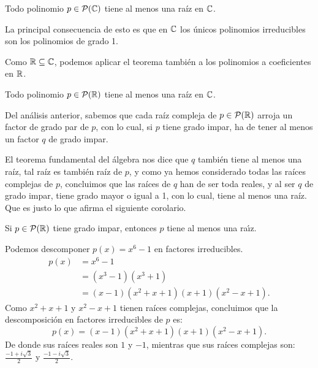 \medskip

\begin{thm}
Todo polinomio $p\in\mathcal{P}(\mathbb{C})$ tiene al menos una raíz en $\mathbb{C}$.
\end{thm}

La principal consecuencia de esto es que en $\mathbb{C}$ los únicos polinomios irreducibles son los polinomios de grado 1.

Como $\mathbb{R}\subseteq \mathbb{C}$, podemos aplicar el teorema también a los polinomios a coeficientes en $\mathbb{R}$.


\medskip

\begin{thm}
Todo polinomio $p\in\mathcal{P}(\mathbb{R})$ tiene al menos una raíz en $\mathbb{C}$.
\end{thm}

Del análisis anterior, sabemos que cada raíz compleja de $p\in\mathcal{P}(\mathbb{R})$ arroja un factor de grado par de $p$, con lo cual, si  $p$ tiene grado impar, ha de tener al menos un factor $q$ de grado impar.

El teorema fundamental del álgebra nos dice que $q$ también tiene al menos una raíz, tal raíz es también raíz de $p$, y como ya hemos considerado todas las raíces complejas de $p$, concluimos que las raíces de $q$ han de ser toda reales, y al ser $q$ de grado impar, tiene grado mayor o igual a 1, con lo cual, tiene al menos una raíz.
Que es justo lo que afirma el siguiente corolario.

\medskip

\begin{cor}
 Si $p\in  \mathcal{P}(\mathbb{R})$ tiene grado impar, entonces $p$ tiene al menos una ra{\'\i}z.
\end{cor}

\medskip

\begin{ejemplo}
Podemos descomponer $p(x)=x^6-1$ en factores irreducibles.
\[
\begin{array}{rl}
p(x)&=x^6-1\\
	&=(x^3-1)(x^3+1)\\
	&=(x-1)(x^2+x+1)(x+1)(x^2-x+1).
\end{array}
\]
Como $x^2+x+1$ y $x^2-x+1$ tienen ra\'ices complejas, concluimos que la descomposición en factores irreducibles de $p$ es:
\[
p(x)=(x-1)(x^2+x+1)(x+1)(x^2-x+1).
\]
De donde sus raíces reales son $1$ y $-1$, mientras que sus raíces complejas son: $\frac{-1+i\sqrt{3}}{2}$ y $\frac{-1-i\sqrt{3}}{2}$.

\end{ejemplo}

